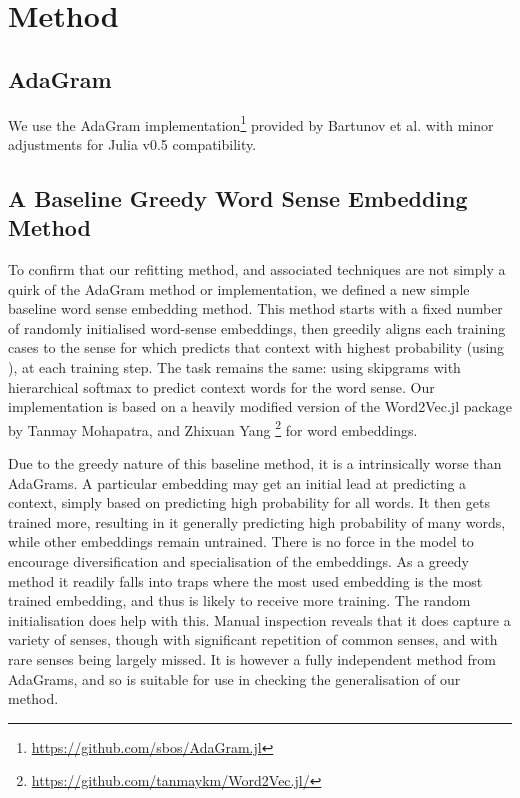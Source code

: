 \documentclass{sig-alternate}
\begin{document}
\section{Method}

\subsection{AdaGram}


We use the AdaGram \parencite{AdaGrams} implementation\footnote{\url{https://github.com/sbos/AdaGram.jl}} provided by Bartunov et al. with minor adjustments for Julia v0.5 compatibility.

\subsection{A Baseline Greedy Word Sense Embedding Method}

To confirm that our refitting method, and associated techniques are not simply a quirk of the AdaGram method or implementation, we defined a new simple baseline word sense embedding method.
This method starts with a fixed number of randomly initialised word-sense embeddings, then greedily aligns each training cases to the sense for which predicts that context with highest probability (using ), at each training step. The task remains the same: using skipgrams with hierarchical softmax to predict context words for the word sense.
Our implementation is based on a heavily modified version of the Word2Vec.jl package by Tanmay Mohapatra, and Zhixuan Yang \footnote{\url{https://github.com/tanmaykm/Word2Vec.jl/}} for word embeddings.

Due to the greedy nature of this baseline method, it is a intrinsically worse than AdaGrams. A particular embedding may get an initial lead at predicting a context, simply based on predicting high probability for all words. It then gets trained more, resulting in it generally predicting high probability of many words, while other embeddings remain untrained. There is no force in the model to encourage diversification and specialisation of the embeddings. As a greedy method it readily falls into traps where the most used embedding is the most trained embedding, and thus is likely to receive more training. The random initialisation does help with this. Manual inspection reveals that it does capture a variety of senses, though with significant repetition of common senses, and with rare senses being largely missed. It is however a fully independent method from AdaGrams, and so is suitable for use in checking the generalisation of our method.
\end{document}
